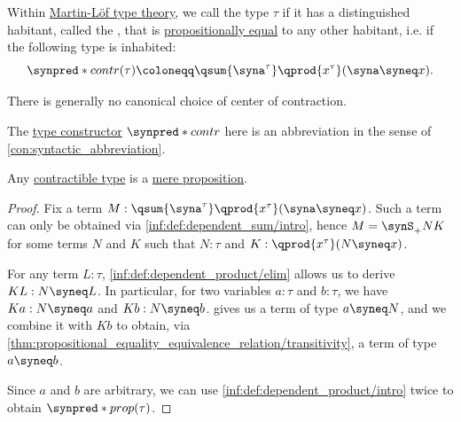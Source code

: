 \begin{definition}\label{def:contractible_type}
  Within \hyperref[def:martin_lof_type_theory]{Martin-L\"of type theory}, we call the type \( \tau \)  if it has a distinguished habitant, called the , that is \hyperref[def:mltt_propositional_equality]{propositionally equal} to any other habitant, i.e. if the following type is inhabited:
  \begin{equation*}
    \synpred*{contr}(\tau) \coloneqq \qsum {\syna^\tau} \qprod {x^\tau} (\syna \syneq x).
  \end{equation*}
\end{definition}
\begin{comments}
  \item There is generally no canonical choice of center of contraction.

  \item The \hyperref[con:type_constructor]{type constructor} \( \synpred*{contr} \) here is an abbreviation in the sense of \cref{con:syntactic_abbreviation}.
\end{comments}

\begin{proposition}\label{thm:contractible_type_is_proposition}
  Any \hyperref[def:contractible_type]{contractible type} is a \hyperref[def:mere_proposition]{mere proposition}.
\end{proposition}
\begin{proof}
  Fix a term \( M: \qsum {\syna^\tau} \qprod {x^\tau} (\syna \syneq x) \). Such a term can only be obtained via \ref{inf:def:dependent_sum/intro}, hence \( M = \synS_+ N K \) for some terms \( N \) and \( K \) such that \( N: \tau \) and \( K: \qprod {x^\tau} (N \syneq x) \).

  For any term \( L: \tau \), \ref{inf:def:dependent_product/elim} allows us to derive \( KL: N \syneq L \). In particular, for two variables \( a: \tau \) and \( b: \tau \), we have \( Ka: N \syneq a \) and \( Kb: N \syneq b \).  gives us a term of type \( a \syneq N \), and we combine it with \( Kb \) to obtain, via \cref{thm:propositional_equality_equivalence_relation/transitivity}, a term of type \( a \syneq b \).

  Since \( a \) and \( b \) are arbitrary, we can use \ref{inf:def:dependent_product/intro} twice to obtain \( \synpred*{prop}(\tau) \).
\end{proof}

